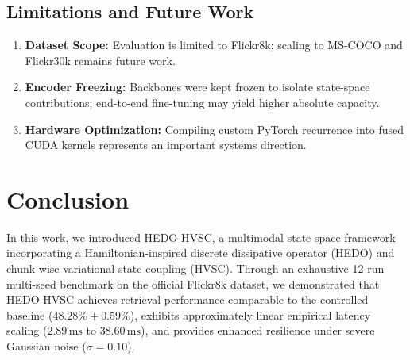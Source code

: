 \documentclass[journal]{IEEEtran}
\begin{document}
\subsection{Limitations and Future Work}
\begin{enumerate}
    \item \textbf{Dataset Scope:} Evaluation is limited to Flickr8k; scaling to MS-COCO \cite{lin2014microsoft} and Flickr30k \cite{young2014image} remains future work.
    \item \textbf{Encoder Freezing:} Backbones were kept frozen to isolate state-space contributions; end-to-end fine-tuning may yield higher absolute capacity.
    \item \textbf{Hardware Optimization:} Compiling custom PyTorch recurrence into fused CUDA kernels represents an important systems direction.
\end{enumerate}

\section{Conclusion}
\label{sec:conclusion}
In this work, we introduced HEDO-HVSC, a multimodal state-space framework incorporating a Hamiltonian-inspired discrete dissipative operator (HEDO) and chunk-wise variational state coupling (HVSC). Through an exhaustive 12-run multi-seed benchmark on the official Flickr8k dataset, we demonstrated that HEDO-HVSC achieves retrieval performance comparable to the controlled baseline ($48.28\% \pm 0.59\%$), exhibits approximately linear empirical latency scaling ($2.89\,\text{ms}$ to $38.60\,\text{ms}$), and provides enhanced resilience under severe Gaussian noise ($\sigma=0.10$).



\end{document}
